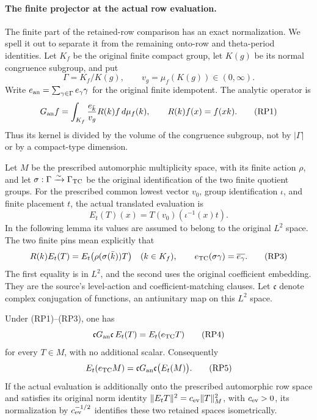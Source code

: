 \paragraph{The finite projector at the actual row evaluation.}
The finite part of the retained-row comparison has an exact
normalization. We spell it out to separate it from the remaining
onto-row and theta-period identities. Let \(K_f\) be the original
finite compact group, let \(K(g)\) be its normal congruence subgroup,
and put
\[
 \Gamma=K_f/K(g),\qquad v_g=\mu_f(K(g))\in(0,\infty).
\]
Write \(e_{\rm an}=\sum_{\gamma\in\Gamma}e_\gamma\gamma\)
for the original finite idempotent. The analytic operator is
\[
 G_{\rm an}f=\int_{K_f}
       \frac{e_{\bar k}}{v_g}R(k)f\,d\mu_f(k),
 \qquad R(k)f(x)=f(xk).
                                                        \tag{RP1}
\]
Thus its kernel is divided by the volume of the congruence
subgroup, not by \(|\Gamma|\) or by a compact-type dimension.

Let \(M\) be the prescribed automorphic multiplicity space,
with its finite action \(\rho\), and let
\(\sigma:\Gamma\xrightarrow{\sim}\Gamma_{\rm TC}\)
be the original identification of the two finite quotient groups.
For the prescribed common lowest vector \(v_0\), group
identification \(\iota\), and finite placement \(t\), the actual
translated evaluation is
\[
 E_t(T)(x)=T(v_0)(\iota^{-1}(x)t).
                                                        \tag{RP2}
\]
In the following lemma its values are assumed to belong to the
original \(L^2\) space. The two finite pins mean explicitly that
\[
 R(k)E_t(T)=E_t\bigl(\rho(\sigma(\bar k))T\bigr)
 \quad(k\in K_f),\qquad
 e_{\rm TC}(\sigma\gamma)=\overline{e_\gamma}.
                                                        \tag{RP3}
\]
The first equality is in \(L^2\), and the second uses the original
coefficient embedding. They are the source's level-action and
coefficient-matching clauses. Let \(\mathfrak c\) denote complex conjugation
of functions, an antiunitary map on this \(L^2\) space.

\begin{lemma}
\label{lem:retained-finite-projector-transport}
Under (RP1)--(RP3), one has
\[
       \mathfrak c G_{\rm an} \mathfrak c\,E_t(T)=E_t(e_{\rm TC}T)
                                                        \tag{RP4}
\]
for every \(T\in M\), with no additional scalar. Consequently
\[
 E_t(e_{\rm TC}M)=\mathfrak c G_{\rm an}\mathfrak c\bigl(E_t(M)\bigr).
                                                        \tag{RP5}
\]
If the actual evaluation is additionally onto the prescribed
automorphic row space and satisfies its original norm identity
\(\|E_tT\|^2=c_{\rm ev}\|T\|_M^2\), with
\(c_{\rm ev}>0\), its normalization by
\(c_{\rm ev}^{-1/2}\) identifies these two retained spaces
isometrically.
\end{lemma}

